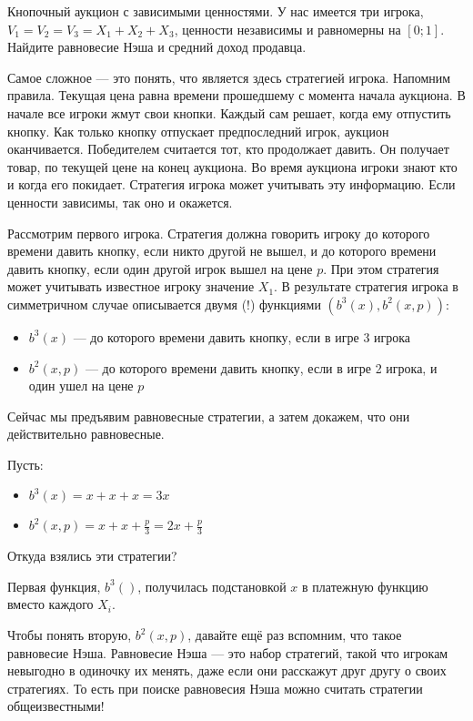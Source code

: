 \begin{myex} Кнопочный аукцион с зависимыми ценностями.
У нас имеется три игрока, $ V_{1}=V_{2}=V_{3}=X_{1}+X_{2}+X_{3} $, ценности независимы и равномерны на $ [0;1] $. Найдите равновесие Нэша и средний доход продавца.

Самое сложное — это понять, что является здесь стратегией игрока. Напомним правила. Текущая цена равна времени прошедшему с момента начала аукциона. В начале все игроки жмут свои кнопки. Каждый сам решает, когда ему отпустить кнопку. Как только кнопку отпускает предпоследний игрок, аукцион оканчивается. Победителем считается тот, кто продолжает давить. Он получает товар, по текущей цене на конец аукциона. Во время аукциона игроки знают кто и когда его покидает. Стратегия игрока может учитывать эту информацию. Если ценности зависимы, так оно и окажется.

Рассмотрим первого игрока. Стратегия должна говорить игроку до которого времени давить кнопку, если никто другой не вышел, и до которого времени давить кнопку, если один другой игрок вышел на цене $ p $. При этом стратегия может учитывать известное игроку значение $ X_{1} $. В результате стратегия игрока в симметричном случае описывается двумя (!) функциями $ (b^{3}(x), b^{2}(x,p)) $:
\begin{itemize}
\item $ b^{3}(x) $ — до которого времени давить кнопку, если в игре 3 игрока
\item $ b^{2}(x,p) $ — до которого времени давить кнопку, если в игре 2 игрока, и один ушел на цене $ p $
\end{itemize}


Сейчас мы предъявим равновесные стратегии, а затем докажем, что они действительно равновесные.

Пусть:
\begin{itemize}
\item $ b^{3}(x)=x+x+x=3x$
\item $ b^{2}(x,p)=x+x+\frac{p}{3}=2x+\frac{p}{3}$
\end{itemize}

Откуда взялись эти стратегии?


Первая функция, $ b^{3}() $, получилась подстановкой $ x $ в платежную функцию вместо каждого $ X_{i} $.

Чтобы понять вторую, $ b^{2}(x,p) $, давайте ещё раз вспомним, что такое равновесие Нэша.  Равновесие Нэша — это набор стратегий, такой что игрокам невыгодно в одиночку их менять, даже если они расскажут друг другу о своих стратегиях. То есть при поиске равновесия Нэша можно считать стратегии общеизвестными!


\end{myex}
